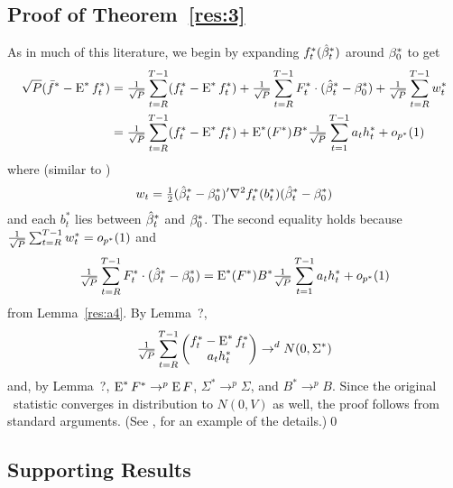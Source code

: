 \documentclass[12pt,fleqn]{article}
\begin{document}
\newcommand{\WesA}[1][]{\oclt{t}
  (F_t^{#1} - \E^{#1} F_t^{#1}) B^{#1} H_t^{#1}}
\newcommand{\WesB}[1][]{\tfrac{1}{\sqrt{P}} \E^{#1} F_t^{#1} \osum{t} (B_t^{#1} -
  B^{#1}) H_t^{#1}}
\newcommand{\WesC}[1][]{\oclt{t}
  (F_t^{#1} - \E^{#1} F_t^{#1}) (B_t^{#1} - B^{#1}) H_t^{#1}}

\subsection*{Proof of Theorem~\ref{res:3}}
  As in much of this literature, we begin by expanding
  $f_t^{*}(\hat \beta_t^*)$ around $\beta_0^*$ to get
  \begin{align*}
    \sqrt{P} (\bar f^* - \operatorname{E}^* f_t^*)
    &= \tfrac{1}{\sqrt{P}} \sum_{t=R}^{T-1} (f_t^{*} - \operatorname{E}^* f_t^*)
     + \tfrac{1}{\sqrt{P}} \sum_{t=R}^{T-1} F_t^* \cdot (\hat \beta_t^* - \beta_0^*)
     + \tfrac{1}{\sqrt{P}} \sum_{t=R}^{T-1} w_t^* \\
    &= \tfrac{1}{\sqrt{P}} \sum_{t=R}^{T-1} (f_t^{*} - \operatorname{E}^* f_t^*)
     + \operatorname{E}^*(F^*) B^* \tfrac{1}{\sqrt{P}} \sum_{t=1}^{T-1} a_t h_t^* + o_{p^*}(1)
  \end{align*}
  where (similar to \citealp{Wes:96})
  \begin{equation*}
    w_{t} = \tfrac12 (\hat \beta_t^* - \beta_0^*)' \nabla^2 f_{t}^*(b_{t}^*) (\hat \beta_t^* - \beta_0^*)
  \end{equation*}
  and each $b_{t}^*$ lies between $\hat \beta_t^*$ and $\beta_0^*$. The second equality holds because
  $\tfrac{1}{\sqrt{P}} \sum_{t=R}^{T-1} w_t^* = o_{p^*}(1)$ and
  \begin{equation*}
    \tfrac{1}{\sqrt{P}} \sum_{t=R}^{T-1} F_t^* \cdot (\hat \beta_t^* - \beta_0^*)
    = \operatorname{E}^*(F^*) B^* \tfrac{1}{\sqrt{P}} \sum_{t=1}^{T-1} a_t h_t^* + o_{p^*}(1)
  \end{equation*}
  from Lemma~\ref{res:a4}. By Lemma~?,
  \begin{equation}\label{eq:19}
    \tfrac{1}{\sqrt{P}} \sum_{t=R}^{T-1} \begin{pmatrix}
      f_t^* - \operatorname{E}^* f_t^* \\ a_t h_t^*
    \end{pmatrix} \to^d N(0, \Sigma^*)
  \end{equation}
  and, by Lemma~?, $\operatorname{E}^* F^* \to^p \operatorname{E} F$, $\Sigma^* \to^p \Sigma$, and
  $B^* \to^p B$.  Since the original \oos\ statistic converges in
  distribution to $N(0, V)$ as well, the proof follows from standard
  arguments. (See \citealp{Cal:14}, for an example of the details.)\qed

\subsection{Supporting Results}
\end{document}
